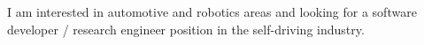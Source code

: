 
% 
%

%
I am interested in automotive and robotics areas and looking for a software developer / research engineer position in the self-driving industry.
% 
%